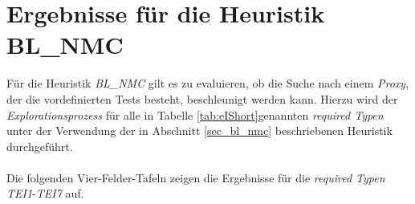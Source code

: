 \section{Ergebnisse für die Heuristik BL\_NMC}\label{sec_evalBLNMC}
Für die \Gls{Heuristik} \emph{BL\_NMC} gilt es zu evaluieren, ob die Suche nach einem \emph{Proxy}, der die vordefinierten Tests besteht, beschleunigt werden kann. Hierzu wird der \emph{Explorationsprozess} für alle in Tabelle \ref{tab:eIShort}genannten \emph{required Typen} unter der Verwendung der in Abschnitt \ref{sec_bl_nmc} beschriebenen \gls{Heuristik} durchgeführt.
\\\\
Die folgenden Vier-Felder-Tafeln zeigen die Ergebnisse für die \emph{required Typen} \emph{TEI1}-\emph{TEI7} auf.
\begin{multicols}{3}
\end{multicols}
\pagebreak
\begin{multicols}{2}
\end{multicols}

\begin{multicols}{2}
\end{multicols}

